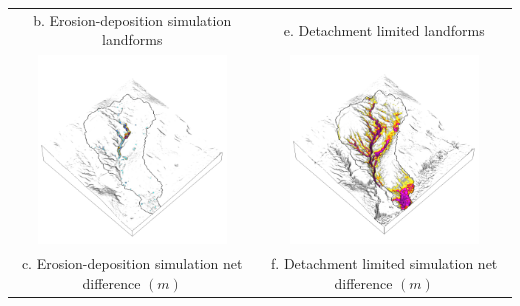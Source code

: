 \documentclass{standalone}
\begin{document}
\begin{tabular}{m{} m{}}
\multicolumn{1}{c}{b. Erosion-deposition simulation landforms}
& \multicolumn{1}{c}{e. Detachment limited landforms}\\
%
\multicolumn{1}{c}{\includegraphics[height=50mm]{../../images/ss_erdep_3d/difference.png}} &
\multicolumn{1}{c}{\includegraphics[height=50mm]{../../images/ss_flux_3d/difference.png}}\\
\multicolumn{1}{c}{c. Erosion-deposition simulation net difference $(m)$} & \multicolumn{1}{c}{f. Detachment limited simulation net difference $(m)$}\\
%
\end{tabular}

\end{document}
